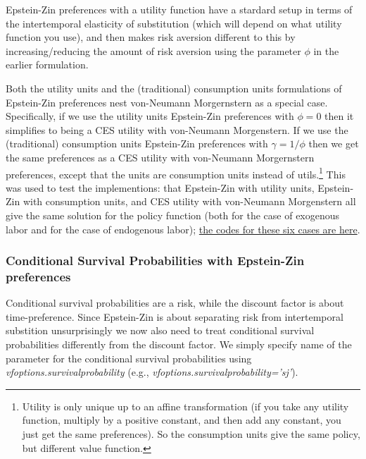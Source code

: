 Epstein-Zin preferences with a utility function have a stardard setup in terms of the intertemporal elasticity of substitution (which will depend on what utility function you use), and then makes risk aversion different to this by increasing/reducing the amount of risk aversion using the parameter $\phi$ in the earlier formulation.

Both the utility units and the (traditional) consumption units formulations of Epstein-Zin preferences nest von-Neumann Morgernstern as a special case. Specifically, if we use the utility units Epstein-Zin preferences with $\phi=0$ then it simplifies to being a CES utility with von-Neumann Morgenstern. If we use the (traditional) consumption units Epstein-Zin preferences with $\gamma=1/\phi$ then we get the same preferences as a CES utility with von-Neumann Morgernstern preferences, except that the units are consumption units instead of utils.\footnote{Utility is only unique up to an affine transformation (if you take any utility function, multiply by a positive constant, and then add any constant, you just get the same preferences). So the consumption units give the same policy, but different value function.} This was used to test the implementions: that Epstein-Zin with utility units, Epstein-Zin with consumption units, and CES utility with von-Neumann Morgenstern all give the same solution for the policy function (both for the case of exogenous labor and for the case of endogenous labor); \href{https://github.com/robertdkirkby/EpsteinZinPrefs}{the codes for these six cases are here}.

\subsubsection{Conditional Survival Probabilities with Epstein-Zin preferences}
Conditional survival probabilities are a risk, while the discount factor is about time-preference. Since Epstein-Zin is about separating risk from intertemporal substition unsurprisingly we now also need to treat conditional survival probabilities differently from the discount factor. We simply specify name of the parameter for the conditional survival probabilities using \textit{vfoptions.survivalprobability} (e.g., \textit{vfoptions.survivalprobability='sj'}).

